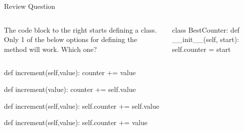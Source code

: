 \documentclass[pdf, aspectratio=169, 12pt]{beamer}
\begin{document}

\begin{frame}[fragile]{Review Question}
	\begin{columns}
		The code block to the right starts defining a class. Only 1 of the below options for defining the  method will work. Which one?
		\begin{pythoncode}
			class BestCounter:
				def __init__(self, start):
					self.counter = start
		\end{pythoncode}
	\end{columns}
	\begin{multicols}{2}
	\begin{poll}
		\footnotesize
	\item	
		\begin{pythoncode}
			def increment(self,value):
				counter += value
		\end{pythoncode}

	\item
		\begin{pythoncode}
			def increment(value):
				counter += self.value
		\end{pythoncode}

	\item
		\begin{pythoncode}
			def increment(self,value):
				self.counter += self.value
		\end{pythoncode}

	\item
		\begin{pythoncode}
			def increment(self,value):
				self.counter += value
		\end{pythoncode}
	\end{poll}
	\end{multicols}
	
	
\end{frame}
\end{document}
